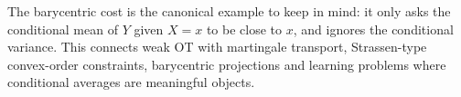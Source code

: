 The barycentric cost is the canonical example to keep in mind: it only asks the conditional mean of $Y$ given $X=x$ to be close to $x$, and ignores the conditional variance. This connects weak OT with martingale transport, Strassen-type convex-order constraints, barycentric projections and learning problems where conditional averages are meaningful objects.
